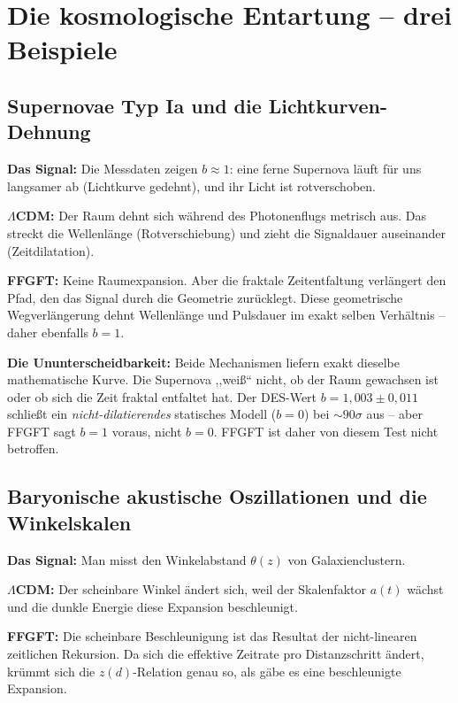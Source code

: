 \section{Die kosmologische Entartung -- drei Beispiele}

\subsection{Supernovae Typ Ia und die Lichtkurven-Dehnung}

\textbf{Das Signal:} Die Messdaten zeigen $b \approx 1$: eine ferne
Supernova läuft für uns langsamer ab (Lichtkurve gedehnt), und ihr Licht
ist rotverschoben.

\textbf{$\Lambda$CDM:} Der Raum dehnt sich während des Photonenflugs
metrisch aus. Das streckt die Wellenlänge (Rotverschiebung) und zieht die
Signaldauer auseinander (Zeitdilatation).

\textbf{FFGFT:} Keine Raumexpansion. Aber die fraktale Zeitentfaltung
verlängert den Pfad, den das Signal durch die Geometrie zurücklegt. Diese
geometrische Wegverlängerung dehnt Wellenlänge und Pulsdauer im exakt
selben Verhältnis -- daher ebenfalls $b = 1$.

\textbf{Die Ununterscheidbarkeit:} Beide Mechanismen liefern exakt dieselbe
mathematische Kurve. Die Supernova ,,weiß`` nicht, ob der Raum gewachsen
ist oder ob sich die Zeit fraktal entfaltet hat. Der DES-Wert
$b = 1{,}003 \pm 0{,}011$ schließt ein \emph{nicht-dilatierendes} statisches
Modell ($b = 0$) bei $\sim 90\sigma$ aus -- aber FFGFT sagt $b = 1$ voraus,
nicht $b = 0$. FFGFT ist daher von diesem Test nicht betroffen.

\subsection{Baryonische akustische Oszillationen und die Winkelskalen}

\textbf{Das Signal:} Man misst den Winkelabstand $\theta(z)$ von
Galaxienclustern.

\textbf{$\Lambda$CDM:} Der scheinbare Winkel ändert sich, weil der
Skalenfaktor $a(t)$ wächst und die dunkle Energie diese Expansion
beschleunigt.

\textbf{FFGFT:} Die scheinbare Beschleunigung ist das Resultat der
nicht-linearen zeitlichen Rekursion. Da sich die effektive Zeitrate pro
Distanzschritt ändert, krümmt sich die $z(d)$-Relation genau so, als gäbe
es eine beschleunigte Expansion.

